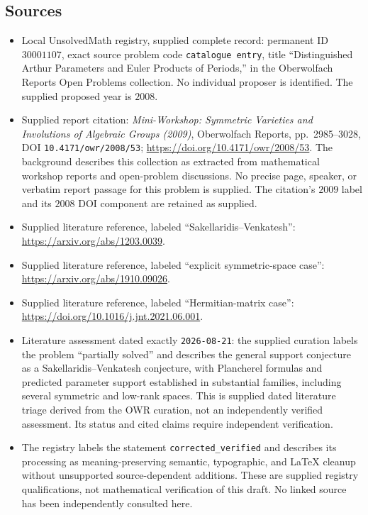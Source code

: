 \documentclass[11pt]{article}
\begin{document}
\subsection{Sources}
\begin{itemize}
\item Local UnsolvedMath registry, supplied complete record: permanent ID \(30001107\), exact source problem code \texttt{catalogue entry}, title ``Distinguished Arthur Parameters and Euler Products of Periods,'' in the Oberwolfach Reports Open Problems collection. No individual proposer is identified. The supplied proposed year is \(2008\).
\item Supplied report citation: \emph{Mini-Workshop: Symmetric Varieties and Involutions of Algebraic Groups (2009)}, Oberwolfach Reports, pp.~2985--3028, DOI \texttt{10.4171/owr/2008/53}; \url{https://doi.org/10.4171/owr/2008/53}. The background describes this collection as extracted from mathematical workshop reports and open-problem discussions. No precise page, speaker, or verbatim report passage for this problem is supplied. The citation's \(2009\) label and its \(2008\) DOI component are retained as supplied.
\item Supplied literature reference, labeled ``Sakellaridis--Venkatesh'': \url{https://arxiv.org/abs/1203.0039}.
\item Supplied literature reference, labeled ``explicit symmetric-space case'': \url{https://arxiv.org/abs/1910.09026}.
\item Supplied literature reference, labeled ``Hermitian-matrix case'': \url{https://doi.org/10.1016/j.jnt.2021.06.001}.
\item Literature assessment dated exactly \texttt{2026-08-21}: the supplied curation labels the problem ``partially solved'' and describes the general support conjecture as a Sakellaridis--Venkatesh conjecture, with Plancherel formulas and predicted parameter support established in substantial families, including several symmetric and low-rank spaces. This is supplied dated literature triage derived from the OWR curation, not an independently verified assessment. Its status and cited claims require independent verification.
\item The registry labels the statement \texttt{corrected\_verified} and describes its processing as meaning-preserving semantic, typographic, and LaTeX cleanup without unsupported source-dependent additions. These are supplied registry qualifications, not mathematical verification of this draft. No linked source has been independently consulted here.
\end{itemize}
\end{document}
